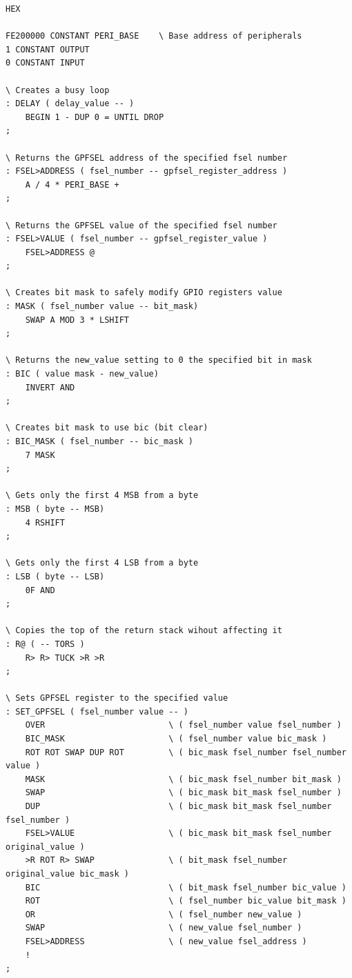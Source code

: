 \documentclass[]{article}
\begin{document}
\begin{verbatim}
HEX

FE200000 CONSTANT PERI_BASE    \ Base address of peripherals
1 CONSTANT OUTPUT   
0 CONSTANT INPUT 

\ Creates a busy loop
: DELAY ( delay_value -- )
    BEGIN 1 - DUP 0 = UNTIL DROP 
;

\ Returns the GPFSEL address of the specified fsel number
: FSEL>ADDRESS ( fsel_number -- gpfsel_register_address ) 
    A / 4 * PERI_BASE + 
;

\ Returns the GPFSEL value of the specified fsel number
: FSEL>VALUE ( fsel_number -- gpfsel_register_value )
    FSEL>ADDRESS @
;

\ Creates bit mask to safely modify GPIO registers value
: MASK ( fsel_number value -- bit_mask)  
    SWAP A MOD 3 * LSHIFT
; 

\ Returns the new_value setting to 0 the specified bit in mask
: BIC ( value mask - new_value)
    INVERT AND
;

\ Creates bit mask to use bic (bit clear)
: BIC_MASK ( fsel_number -- bic_mask )
    7 MASK 
;

\ Gets only the first 4 MSB from a byte
: MSB ( byte -- MSB)
    4 RSHIFT 
;

\ Gets only the first 4 LSB from a byte
: LSB ( byte -- LSB)
    0F AND 
;

\ Copies the top of the return stack wihout affecting it
: R@ ( -- TORS )
    R> R> TUCK >R >R
;
 
\ Sets GPFSEL register to the specified value
: SET_GPFSEL ( fsel_number value -- )   
    OVER                         \ ( fsel_number value fsel_number ) 
    BIC_MASK                     \ ( fsel_number value bic_mask ) 
    ROT ROT SWAP DUP ROT         \ ( bic_mask fsel_number fsel_number value )
    MASK                         \ ( bic_mask fsel_number bit_mask ) 
    SWAP                         \ ( bic_mask bit_mask fsel_number ) 
    DUP                          \ ( bic_mask bit_mask fsel_number fsel_number )
    FSEL>VALUE                   \ ( bic_mask bit_mask fsel_number original_value )
    >R ROT R> SWAP               \ ( bit_mask fsel_number original_value bic_mask )
    BIC                          \ ( bit_mask fsel_number bic_value ) 
    ROT                          \ ( fsel_number bic_value bit_mask )
    OR                           \ ( fsel_number new_value )
    SWAP                         \ ( new_value fsel_number )
    FSEL>ADDRESS                 \ ( new_value fsel_address )
    !      
;


\end{verbatim}
\end{document}
